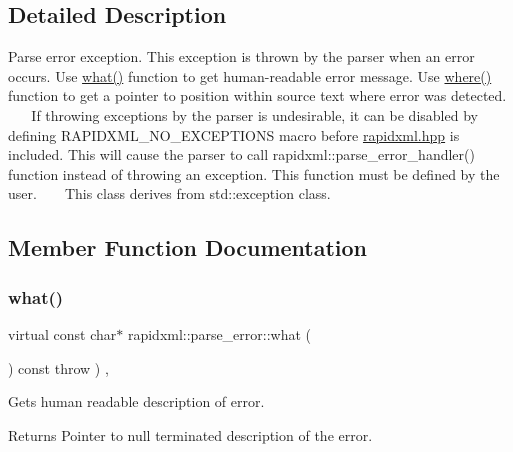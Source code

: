 \subsection{Detailed Description}
Parse error exception. This exception is thrown by the parser when an error occurs. Use \mbox{\hyperlink{classrapidxml_1_1parse__error_a986003116ebcb49a69a20228da306232}{what()}} function to get human-\/readable error message. Use \mbox{\hyperlink{classrapidxml_1_1parse__error_ab139528f4d9e960f0ee807d22d6c032d}{where()}} function to get a pointer to position within source text where error was detected. ~\newline
~\newline
 If throwing exceptions by the parser is undesirable, it can be disabled by defining R\+A\+P\+I\+D\+X\+M\+L\+\_\+\+N\+O\+\_\+\+E\+X\+C\+E\+P\+T\+I\+O\+NS macro before \mbox{\hyperlink{rapidxml_8hpp}{rapidxml.\+hpp}} is included. This will cause the parser to call rapidxml\+::parse\+\_\+error\+\_\+handler() function instead of throwing an exception. This function must be defined by the user. ~\newline
~\newline
 This class derives from {\ttfamily std\+::exception} class. 

\subsection{Member Function Documentation}
\mbox{\label{classrapidxml_1_1parse__error_a986003116ebcb49a69a20228da306232}} 
\subsubsection{\texorpdfstring{what()}{what()}}
{\footnotesize\ttfamily virtual const char$\ast$ rapidxml\+::parse\+\_\+error\+::what (\begin{DoxyParamCaption}{ }\end{DoxyParamCaption}) const throw  ) \hspace{0.3cm}{\ttfamily [inline]}, {\ttfamily [virtual]}}

Gets human readable description of error. \begin{DoxyReturn}{Returns}
Pointer to null terminated description of the error. 
\end{DoxyReturn}
\mbox{\label{classrapidxml_1_1parse__error_ab139528f4d9e960f0ee807d22d6c032d}} 
